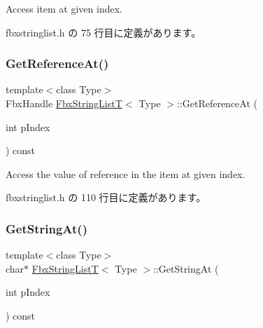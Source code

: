 Access item at given index. 



 fbxstringlist.\+h の 75 行目に定義があります。

\mbox{\label{class_fbx_string_list_t_ae3987a28b37de829cbf0bed42b5b5091}} 
\subsubsection{\texorpdfstring{Get\+Reference\+At()}{GetReferenceAt()}}
{\footnotesize\ttfamily template$<$class Type$>$ \\
Fbx\+Handle \hyperlink{class_fbx_string_list_t}{Fbx\+String\+ListT}$<$ Type $>$\+::Get\+Reference\+At (\begin{DoxyParamCaption}\item[{int}]{p\+Index }\end{DoxyParamCaption}) const\hspace{0.3cm}{\ttfamily [inline]}}



Access the value of reference in the item at given index. 



 fbxstringlist.\+h の 110 行目に定義があります。

\mbox{\label{class_fbx_string_list_t_a9027620858ce83b4232cca2815b71047}} 
\subsubsection{\texorpdfstring{Get\+String\+At()}{GetStringAt()}}
{\footnotesize\ttfamily template$<$class Type$>$ \\
char$\ast$ \hyperlink{class_fbx_string_list_t}{Fbx\+String\+ListT}$<$ Type $>$\+::Get\+String\+At (\begin{DoxyParamCaption}\item[{int}]{p\+Index }\end{DoxyParamCaption}) const\hspace{0.3cm}{\ttfamily [inline]}}



